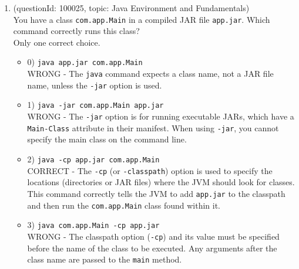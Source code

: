 \documentclass[12pt]{article}
\begin{document}
\begin{enumerate}[label=(\arabic*)]
\begin{itemize}
\item 2) It is interpreted as a comment, but the compiler issues a warning about the unknown Unicode escape.
 \\ 
WRONG - This is a fatal compilation error, not a warning.

\item 3) It causes a compilation error because `&` is not a valid character to be escaped with `\u` in this context.
 \\ 
WRONG - The issue is not that \verb|&| cannot be escaped, but that the \verb|\u| escape sequence itself is incomplete or malformed.

\end{itemize}
\item (questionId: 100025, topic: Java Environment and Fundamentals) \\ 
You have a class \verb|com.app.Main| in a compiled JAR file \verb|app.jar|. Which command correctly runs this class?
\\ \noindent Only one correct choice. 
\begin{itemize}
\item 0) \verb|java app.jar com.app.Main|
 \\ 
WRONG - The \verb|java| command expects a class name, not a JAR file name, unless the \verb|-jar| option is used.

\item 1) \verb|java -jar com.app.Main app.jar|
 \\ 
WRONG - The \verb|-jar| option is for running executable JARs, which have a \verb|Main-Class| attribute in their manifest. When using \verb|-jar|, you cannot specify the main class on the command line.

\item 2) \verb|java -cp app.jar com.app.Main|
 \\ 
CORRECT - The \verb|-cp| (or \verb|-classpath|) option is used to specify the locations (directories or JAR files) where the JVM should look for classes. This command correctly tells the JVM to add \verb|app.jar| to the classpath and then run the \verb|com.app.Main| class found within it.

\item 3) \verb|java com.app.Main -cp app.jar|
 \\ 
WRONG - The classpath option (\verb|-cp|) and its value must be specified before the name of the class to be executed. Any arguments after the class name are passed to the \verb|main| method.


\end{itemize}
\end{enumerate}
\end{document}
